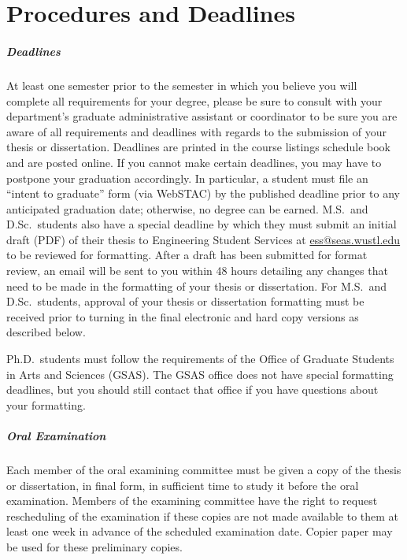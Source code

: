 \chapter{Procedures and Deadlines}
\label{app:procedures}

\paragraph{Deadlines}

At least one semester prior to the semester in which you believe you will
complete all requirements for your degree, please be sure to consult with your
department's graduate administrative assistant or coordinator to be sure you
are aware of all requirements and deadlines with regards to the submission of
your thesis or dissertation.  Deadlines are printed in the course listings
schedule book and are posted online.  If you cannot make certain deadlines, you
may have to postpone your graduation accordingly.  In particular, a student
must file an ``intent to graduate'' form (via WebSTAC) by the published
deadline prior to any anticipated graduation date; otherwise, no degree can be
earned.  M.S.\ and D.Sc.\ students also have a special deadline by which they
must submit an initial draft (PDF) of their thesis to Engineering Student Services 
at \uline{ess@seas.wustl.edu}  to be reviewed for formatting.  After a
draft has been submitted for format review, an email will be sent to you within
48 hours detailing any changes that need to be made in the formatting of your
thesis or dissertation.  For M.S.\ and D.Sc.\ students, approval of your thesis
or dissertation formatting must be received prior to turning in the final
electronic and hard copy versions as described below.  

Ph.D.\ students must follow the requirements of the Office of Graduate Students
in Arts and Sciences (GSAS).  The GSAS office does not have special formatting
deadlines, but you should still contact that office if you have questions about
your formatting.

\paragraph{Oral Examination}

Each member of the oral examining committee must be given a copy of the thesis
or dissertation, in final form, in sufficient time to study it before the oral
examination.  Members of the examining committee have the right to request
rescheduling of the examination if these copies are not made available to them
at least one week in advance of the scheduled examination date.  Copier paper
may be used for these preliminary copies.

